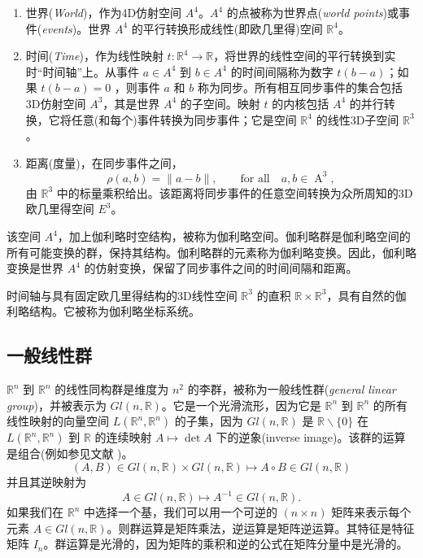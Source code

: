 \documentclass[11pt,fontset=founder]{ctexart}
\begin{document}
\begin{enumerate}
\item 世界(\emph{World})，作为4D仿射空间 $A^{4}$。$A^{4}$ 的点被称为世界点(\emph{world points})或事件(\emph{events})。世界 $A^{4}$ 的平行转换形成线性(即欧几里得)空间 $\mathbb{R}^{4}$。

\item 时间(\emph{Time})，作为线性映射 $t:\mathbb{R}^{4}\rightarrow \mathbb{R}$，将世界的线性空间的平行转换到实时“时间轴”上。从事件 $a\in A^{4}$ 到 $b\in A^{4}$ 的时间间隔称为数字 $t(b-a)$；如果 $t(b-a)=0$ ，则事件 $a$ 和 $b$ 称为同步。所有相互同步事件的集合包括3D仿射空间 $A^{3}$，其是世界 $A^{4}$ 的子空间。映射 $t$ 的内核包括 $A^{4}$ 的并行转换，它将任意(和每个)事件转换为同步事件；它是空间 $\mathbb{R}^{4}$ 的线性3D子空间 $\mathbb{R}^{3}$。

\item 距离(度量)，在同步事件之间，
\begin{equation*}
\rho (a,b)=\parallel a-b\parallel ,\qquad \text{for all}\quad a,b\in \mathop %
A\nolimits^{3},
\end{equation*}%
由 $\mathbb{R}^{3}$ 中的标量乘积给出。该距离将同步事件的任意空间转换为众所周知的3D欧几里得空间 $E^{3}$。
\end{enumerate}

该空间 $A^4$，加上伽利略时空结构，被称为伽利略空间。伽利略群是伽利略空间的所有可能变换的群，保持其结构。伽利略群的元素称为伽利略变换。因此，伽利略变换是世界 $A^4$ 的仿射变换，保留了同步事件之间的时间间隔和距离。

时间轴与具有固定欧几里得结构的3D线性空间 $\mathbb{R}^{3}$ 的直积 $\mathbb{R}\times \mathbb{R}^{3}$，具有自然的伽利略结构。它被称为伽利略坐标系统。

\subsection{一般线性群}

$\mathbb{R}^{n}$ 到 $\mathbb{R}^{n}$ 的线性同构群是维度为 $n^{2}$ 的李群，被称为一般线性群(\textit{general linear group})，并被表示为 $Gl(n,\mathbb{R})$。它是一个光滑流形，因为它是 $\mathbb{R}^{n}$ 到 $\mathbb{R}^{n}$ 的所有线性映射的向量空间 $L(\mathbb{R}^{n},\mathbb{R}^{n})$ 的子集，因为 $Gl(n,\mathbb{R})$ 是 $\mathbb{R}\backslash \{0\}$ 在 $L(\mathbb{R}^{n},\mathbb{R}^{n})$ 到 $\mathbb{R}$ 的连续映射 $ A\mapsto \det A$ 下的逆象(inverse image)。该群的运算是组合(例如参见文献 \cite{Arnold,Abraham,GaneshSprBig,GaneshADG})。
\begin{equation*}
(A,B)\in Gl(n,\mathbb{R})\times Gl(n,\mathbb{R})\mapsto A\circ B\in Gl(n,%
\mathbb{R})
\end{equation*}%
并且其逆映射为
\begin{equation*}
A\in Gl(n,\mathbb{R})\mapsto A^{-1}\in Gl(n,\mathbb{R}).
\end{equation*}%
如果我们在 $\mathbb{R}^{n}$ 中选择一个基，我们可以用一个可逆的 $(n\times n)$ 矩阵来表示每个元素 $ A\in Gl(n,\mathbb{R})$。则群运算是矩阵乘法，逆运算是矩阵逆运算。其特征是特征矩阵 $I_{n}$。群运算是光滑的，因为矩阵的乘积和逆的公式在矩阵分量中是光滑的。
\end{document}
